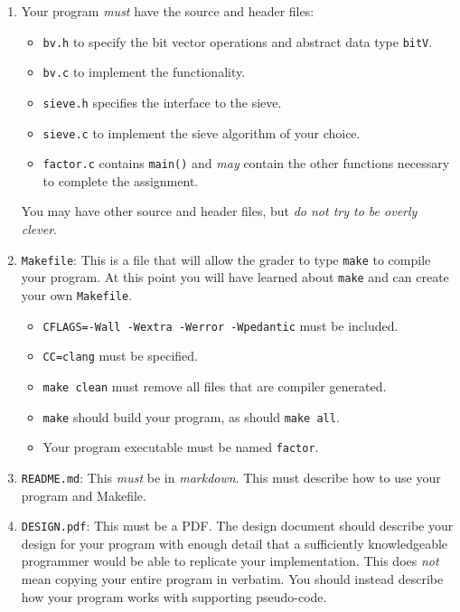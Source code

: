 \documentclass{article}
\begin{document}
\begin{enumerate}
\item Your program \emph{must} have the source and header files:
\begin{itemize}
\item \texttt{bv.h} to specify the bit vector operations and abstract data type \texttt{bitV}.
\item \texttt{bv.c} to implement the functionality.
\item \texttt{sieve.h} specifies the interface to the sieve.
\item \texttt{sieve.c} to implement the sieve algorithm of your choice.
\item \texttt{factor.c} contains \texttt{main()} and \emph{may} contain the other functions necessary to complete the assignment.
\end{itemize}
You may have other source and header files, but \emph{do not try to be overly clever}.

\item \texttt{Makefile}: This is a file that will allow the grader to type \texttt{make} to compile your program. At this point you will have learned about \texttt{make} and can create your own \texttt{Makefile}.
\begin{itemize}
\item \texttt{CFLAGS=-Wall -Wextra -Werror -Wpedantic} must be included.
\item \texttt{CC=clang} must be specified.
\item \texttt{make clean} must remove all files that are compiler generated.
\item \texttt{make} should build your program, as should \texttt{make all}.
\item Your program executable must be named \texttt{factor}.
\end{itemize}

\item \texttt{README.md}: This \emph{must} be in \emph{markdown}. This must describe how to use your program and Makefile.

\item \texttt{DESIGN.pdf}: This must be a PDF. The design document should describe your design for your program with enough detail that a sufficiently knowledgeable programmer would be able to replicate your implementation. This does \emph{not} mean copying your entire program in verbatim. You should instead describe how your program works with supporting pseudo-code.

\end{enumerate}
\end{document}
